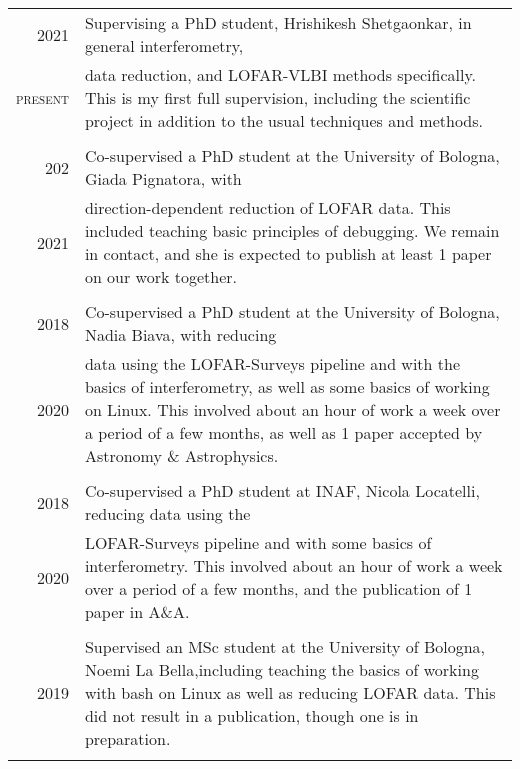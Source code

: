 \documentclass[10pt]{article} %
\begin{document}
\begin{tabular}{r|p{12.5cm}}
	
	\textsc{2021}    & Supervising a PhD student, Hrishikesh Shetgaonkar, in general interferometry,\\
	\textsc{present} & data reduction, and LOFAR-VLBI methods specifically. This is my first full supervision, including the scientific project in addition to the usual techniques and methods.\\
\multicolumn{2}{c}{} \\

	
	\textsc{202}    & Co-supervised a PhD student at the University of Bologna, Giada Pignatora, with \\
	\textsc{2021} & direction-dependent reduction of LOFAR data. This included teaching basic principles of debugging. We remain in contact, and she is expected to publish at least 1 paper on our work together.\\
	\multicolumn{2}{c}{} \\

	\textsc{2018}    & Co-supervised a PhD student at the University of Bologna, Nadia Biava, with reducing\\
	\textsc{2020} & data using the LOFAR-Surveys pipeline and with the basics of interferometry, as
		well as some basics of working on Linux. This involved about an hour of work
		a week over a period of a few months, as well as 1 paper accepted by
		Astronomy \& Astrophysics.\\
	\multicolumn{2}{c}{} \\
	
	\textsc{2018}    & Co-supervised a PhD student at INAF, Nicola Locatelli, reducing data using the\\
	\textsc{2020} & LOFAR-Surveys pipeline and with some basics of interferometry. This involved
	about an hour of work a week over a period of a few months, and the publication
	of 1 paper in A\&A.\\
	\multicolumn{2}{c}{} \\
	
	\textsc{2019}    & Supervised an MSc student at the University of Bologna, Noemi La Bella,including teaching the
	basics of working with bash on Linux as well as reducing LOFAR data. This did
	not result in a publication, though one is in preparation.\\
	\multicolumn{2}{c}{} \\
		
\end{tabular}


\end{document}
